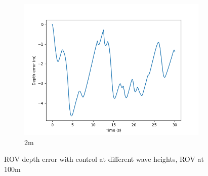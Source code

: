 \documentclass[class=article, crop=false]{standalone}
\begin{document}
\begin{figure}
\begin{subfigure}[b]{0.48\textwidth}
        \includegraphics{scenario1/rov-100m/2.0m/rov_depth_error_controlled}
        \caption{2m}
        \label{}
    \end{subfigure}

    \caption{ROV depth error with control at different wave heights, ROV at 100m}
\end{figure}
\end{document}
